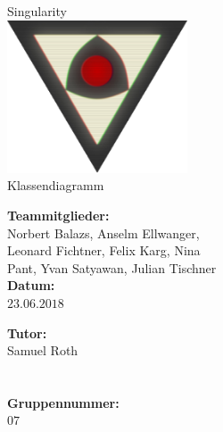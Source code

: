 \documentclass[12pt]{article}
\newcommand{\changefont}[4]{{\fontfamily{#1}\fontsize{#2}{#3}\selectfont #4}} %
\begin{document}
\renewcommand{\figurename}{Fig.}%
\renewcommand{\arraystretch}{1.4}%

\begin{titlepage}
    \begin{center}
        \changefont{pbk}{32}{35}{Singularity}\\\vspace{3em}
        \includegraphics[width=0.4\textwidth]{res/SingularityLogo2.png}\\\vspace{5em}
        \changefont{cmr}{32}{35}{Klassendiagramm}
    \end{center}
    \vspace{7em}

    \begin{minipage}[t]{.5\textwidth}
        \begin{center}
            \textbf{Teammitglieder:}\\
            \vspace{.5em}
            Norbert Balazs, Anselm Ellwanger,\\
            Leonard Fichtner, Felix Karg, Nina\\
            Pant, Yvan Satyawan, Julian Tischner\\
            \vspace{2em}
            \textbf{Datum:}\\
            \vspace{.5em}
            $23.06.2018$
        \end{center}
    \end{minipage}
    \begin{minipage}[t]{.5\textwidth}
        \begin{center}
            \textbf{Tutor:}\\
            \vspace{.5em}
            Samuel Roth\\
            \quad\\
            \quad\\
            \vspace{2em}
            \textbf{Gruppennummer:}\\
            \vspace{.5em}
            $07$
        \end{center}
    \end{minipage}
\end{titlepage}
\end{document}
